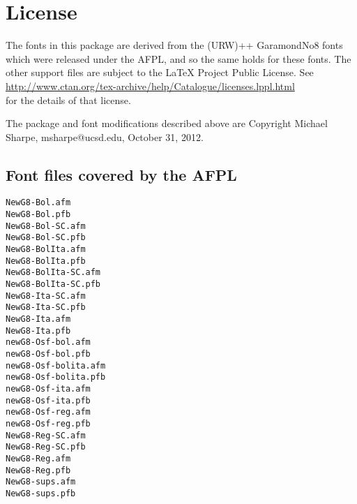 \documentclass[11pt]{article}
\begin{document}
\section{License}
The fonts in this package are derived from the (URW)++ GaramondNo8 fonts which were released under the AFPL, and so the same holds for these fonts. The other support files are subject to the LaTeX Project Public License. See\\
 \url{http://www.ctan.org/tex-archive/help/Catalogue/licenses.lppl.html}\\
  for the details of that license.

The package and font modifications described above are Copyright Michael Sharpe, msharpe@ucsd.edu, October 31, 2012.

\subsection{Font files covered by the AFPL}
\begin{verbatim}
NewG8-Bol.afm
NewG8-Bol.pfb
NewG8-Bol-SC.afm
NewG8-Bol-SC.pfb
NewG8-BolIta.afm
NewG8-BolIta.pfb
NewG8-BolIta-SC.afm
NewG8-BolIta-SC.pfb
NewG8-Ita-SC.afm
NewG8-Ita-SC.pfb
NewG8-Ita.afm
NewG8-Ita.pfb
newG8-Osf-bol.afm
newG8-Osf-bol.pfb
newG8-Osf-bolita.afm
newG8-Osf-bolita.pfb
newG8-Osf-ita.afm
newG8-Osf-ita.pfb
newG8-Osf-reg.afm
newG8-Osf-reg.pfb
NewG8-Reg-SC.afm
NewG8-Reg-SC.pfb
NewG8-Reg.afm
NewG8-Reg.pfb
NewG8-sups.afm
NewG8-sups.pfb
\end{verbatim}
\end{document}
